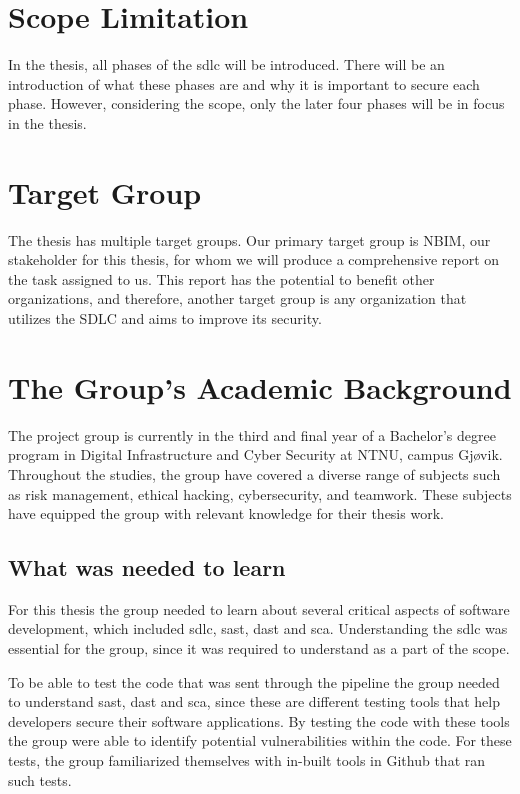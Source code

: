 \section{Scope Limitation}
In the thesis, all phases of the \acrlong{sdlc} will be introduced. There will be an introduction of what these phases are and why it is important to secure each phase. However, considering the scope, only the later four phases will be in focus in the thesis. 

\section{Target Group}
The thesis has multiple target groups. Our primary target group is NBIM, our stakeholder for this thesis, for whom we will produce a comprehensive report on the task assigned to us. This report has the potential to benefit other organizations, and therefore, another target group is any organization that utilizes the SDLC and aims to improve its security.

\section{The Group’s Academic Background}
The project group is currently in the third and final year of a Bachelor's degree program in Digital Infrastructure and Cyber Security at NTNU, campus Gjøvik. Throughout the studies, the group have covered a diverse range of subjects such as risk management, ethical hacking, cybersecurity, and teamwork. These subjects have equipped the group with relevant knowledge for their thesis work.

\subsection{What was needed to learn}%
For this thesis the group needed to learn about several critical aspects of software development, which included  \acrshort{sdlc}, \acrlong{sast}, \acrlong{dast} and \acrlong{sca}. Understanding the \acrshort{sdlc} was essential for the group, since it was required to understand as a part of the scope. 

To be able to test the code that was sent through the pipeline the group needed to understand \acrshort{sast}, \acrshort{dast} and \acrshort{sca}, since these are different testing tools that help developers secure their software applications. By testing the code with these tools the group were able to identify potential vulnerabilities within the code. For these tests, the group familiarized themselves with in-built tools in Github that ran such tests. 

